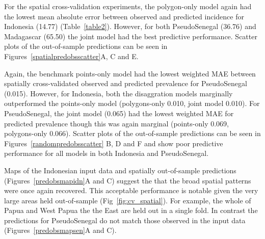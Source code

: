 \documentclass[10pt,letterpaper]{article}
\begin{document}


For the spatial cross-validation experiments, the polygon-only model again had the lowest mean absolute error between observed and predicted incidence for Indonesia (14.77) (Table~\ref{table2}).
However, for both PseudoSenegal (36.76) and Madagascar (65.50) the joint model had the best predictive performance.
Scatter plots of the out-of-sample predictions can be seen in Figures~\ref{spatialpredobsscatter}A, C and E.

Again, the benchmark points-only model had the lowest weighted MAE between spatially cross-validated observed and predicted prevalence for PseudoSenegal (0.015).
However, for Indonesia, both the disaggration models marginally outperformed the points-only model (polygons-only 0.010, joint model 0.010). 
For PseudoSenegal, the joint model (0.065) had the lowest weighted MAE for predicted prevalence though this was again marginal (points-only 0.069, polygons-only 0.066).
Scatter plots of the out-of-sample predictions can be seen in Figures~\ref{randompredobsscatter} B, D and F and show poor predictive performance for all models in both Indonesia and PseudoSenegal.

Maps of the Indonesian input data and spatially out-of-sample predictions (Figures~\ref{predobsmapidn}A and C) suggest the that the broad spatial patterns were once again recovered.
This acceptable performance is notable given the very large areas held out-of-sample (Fig~\ref{fig:cv_spatial}).
For example, the whole of Papua and West Papua the the East are held out in a single fold.
In contrast the predictions for PseudoSenegal do not match those observed in the input data (Figures~\ref{predobsmapsen}A and C). 


\end{document}
